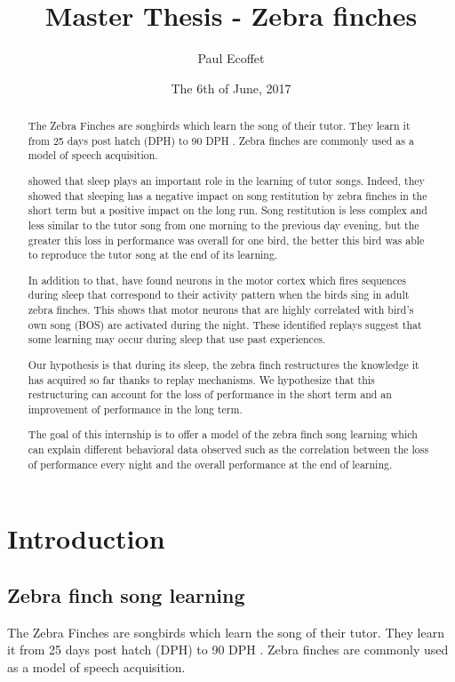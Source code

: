 \documentclass{report}
\title{Master Thesis - Zebra finches}
\author{Paul Ecoffet}
\date{The 6th of June, 2017}
\begin{document}
\maketitle

\begin{abstract}
The Zebra Finches are songbirds which learn the song of their tutor. They learn
it from 25 days post hatch (DPH) to 90 DPH \parencite{liu_juvenile_2004}. Zebra
finches are commonly used as a model of speech acquisition.

\textcite{deregnaucourt_how_2005} showed that sleep plays an important role in
the learning of tutor songs. Indeed, they showed that sleeping has a negative
impact on song restitution by zebra finches in the short term but a positive
impact on the long run. Song restitution is less complex and less similar to the
tutor song from one morning to the previous day evening, but the greater this
loss in performance was overall for one bird, the better this bird was able to
reproduce the tutor song at the end of its learning.


In addition to that, \textcite{dave_song_2000} have found neurons in the motor
cortex which fires sequences during sleep that correspond to their activity
pattern when the birds sing in adult zebra finches. This shows that motor
neurons that are highly correlated with bird's own song (BOS) are activated
during the night. These identified replays suggest that some learning may occur
during sleep that use past experiences.

Our hypothesis is that during its sleep, the zebra finch restructures the
knowledge it has acquired so far thanks to replay mechanisms. We hypothesize
that this restructuring can account for the loss of performance in the short
term and an improvement of performance in the long term.

The goal of this internship is to offer a model of the zebra finch song
learning which can explain different behavioral data observed such as the
correlation between the loss of performance every night and the overall
performance at the end of learning.
\end{abstract}

\tableofcontents

\chapter{Introduction}

\section{Zebra finch song learning}
The Zebra Finches are songbirds which learn the song of their tutor. They learn
it from 25 days post hatch (DPH) to 90 DPH \parencite{liu_juvenile_2004}. Zebra
finches are commonly used as a model of speech acquisition.
\end{document}
